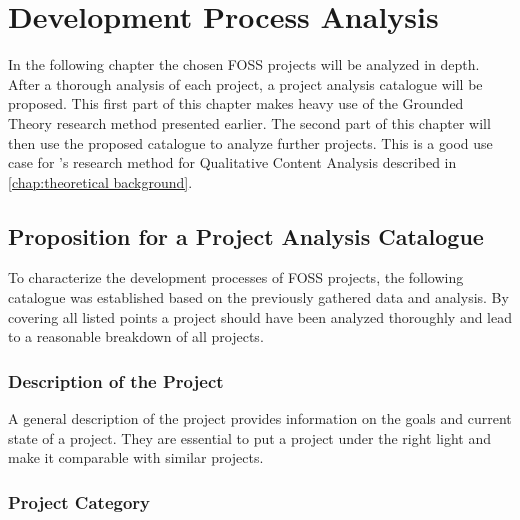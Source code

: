 \chapter{Development Process Analysis} %
\label{chap:analysis}

In the following chapter the chosen \ac{FOSS} projects will be analyzed in
depth. After a thorough analysis of each project, a project analysis catalogue
will be proposed. This first part of this chapter makes heavy use of the
Grounded Theory research method presented earlier. The second part of this
chapter will then use the proposed catalogue to analyze further projects. This
is a good use case for \citeauthor{Mayring2000}'s research method for
Qualitative Content Analysis described in \autoref{chap:theoretical
background}.













\cleardoublepage

\section{Proposition for a Project Analysis Catalogue} %

To characterize the development processes of \ac{FOSS} projects, the following
catalogue was established based on the previously gathered data and analysis.
By covering all listed points a project should have been analyzed thoroughly
and lead to a reasonable breakdown of all projects.

\subsection{Description of the Project}

A general description of the project provides information on the goals and
current state of a project. They are essential to put a project under the right
light and make it comparable with similar projects.

\subsection{Project Category}

